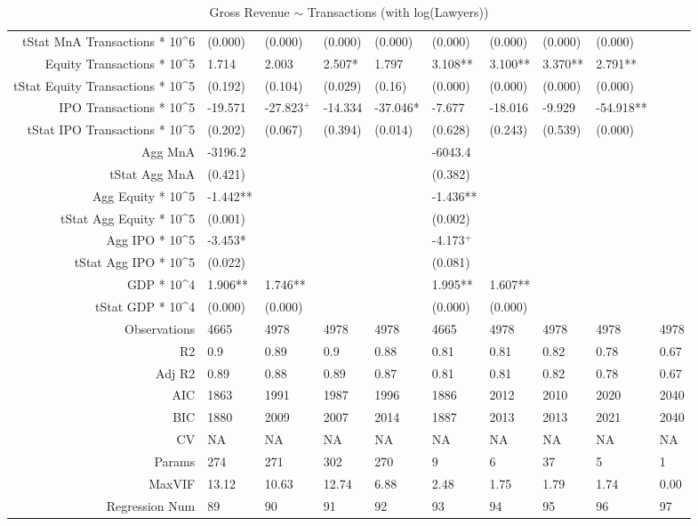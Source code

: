 \begin{table}[ht]
\begin{tabular}{rlllllllll}
  tStat MnA Transactions * 10^6 & (0.000) & (0.000) & (0.000) & (0.000) & (0.000) & (0.000) & (0.000) & (0.000) &  \\ 
  Equity Transactions * 10^5 & 1.714 & 2.003 & 2.507* & 1.797 & 3.108** & 3.100** & 3.370** & 2.791** &  \\ 
  tStat Equity Transactions * 10^5 & (0.192) & (0.104) & (0.029) & (0.16) & (0.000) & (0.000) & (0.000) & (0.000) &  \\ 
  IPO Transactions * 10^5 & -19.571 & -27.823$^{+}$ & -14.334 & -37.046* & -7.677 & -18.016 & -9.929 & -54.918** &  \\ 
  tStat IPO Transactions * 10^5 & (0.202) & (0.067) & (0.394) & (0.014) & (0.628) & (0.243) & (0.539) & (0.000) &  \\ 
  Agg MnA & -3196.2 &  &  &  & -6043.4 &  &  &  &  \\ 
  tStat Agg MnA & (0.421) &  &  &  & (0.382) &  &  &  &  \\ 
  Agg Equity * 10^5 & -1.442** &  &  &  & -1.436** &  &  &  &  \\ 
  tStat Agg Equity * 10^5 & (0.001) &  &  &  & (0.002) &  &  &  &  \\ 
  Agg IPO * 10^5 & -3.453* &  &  &  & -4.173$^{+}$ &  &  &  &  \\ 
  tStat Agg IPO * 10^5 & (0.022) &  &  &  & (0.081) &  &  &  &  \\ 
  GDP * 10^4 & 1.906** & 1.746** &  &  & 1.995** & 1.607** &  &  &  \\ 
  tStat GDP * 10^4 & (0.000) & (0.000) &  &  & (0.000) & (0.000) &  &  &  \\ 
  Observations & 4665 & 4978 & 4978 & 4978 & 4665 & 4978 & 4978 & 4978 & 4978 \\ 
  R2 & 0.9 & 0.89 & 0.9 & 0.88 & 0.81 & 0.81 & 0.82 & 0.78 & 0.67 \\ 
  Adj R2 & 0.89 & 0.88 & 0.89 & 0.87 & 0.81 & 0.81 & 0.82 & 0.78 & 0.67 \\ 
  AIC & 1863 & 1991 & 1987 & 1996 & 1886 & 2012 & 2010 & 2020 & 2040 \\ 
  BIC & 1880 & 2009 & 2007 & 2014 & 1887 & 2013 & 2013 & 2021 & 2040 \\ 
  CV & NA & NA & NA & NA & NA & NA & NA & NA & NA \\ 
  Params & 274 & 271 & 302 & 270 & 9 & 6 & 37 & 5 & 1 \\ 
  MaxVIF & 13.12 & 10.63 & 12.74 & 6.88 & 2.48 & 1.75 & 1.79 & 1.74 & 0.00 \\ 
  Regression Num & 89 & 90 & 91 & 92 & 93 & 94 & 95 & 96 & 97 \\ 
   \hline
\end{tabular}
\caption{Gross Revenue $\sim$ Transactions (with log(Lawyers))} 
\end{table}
